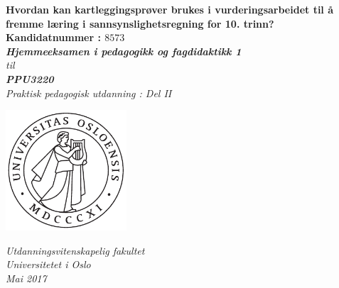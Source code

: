 \documentclass[main.tex]{subfiles}
\begin{document}
\thispagestyle{empty}
\begin{center}        %
  \vspace{5mm}        %
  \LARGE
  \textbf{Hvordan kan kartleggingsprøver brukes i vurderingsarbeidet til å fremme læring i 
          sannsynslighetsregning for 10. trinn?} \\
  \Large
  \vspace{10mm}
  \large
  \textbf{Kandidatnummer : $8573$} \\
  \vspace{20mm}
  \Large
  {\bf{\textsl{Hjemmeeksamen i pedagogikk og fagdidaktikk 1}}} \\
  \textsl{til} \\
  \vspace{2mm}
  {\bf{\textsl{PPU3220}}} \\
  \vspace{5mm}
  {\large \textsl {Praktisk pedagogisk utdanning : Del II}}\\
  \vspace{10mm}
  \centerline{\includegraphics[width=45mm,height=45mm]{../figures/uiosegl.pdf}} 
  \vspace{8mm}
  \textsl{Utdanningsvitenskapelig fakultet} \\
  \textsl{Universitetet i Oslo} \\
  \vspace{5mm}
  \large
  \textsl{Mai 2017} \\
  \vspace{2cm}


\end{center}
\end{document}
